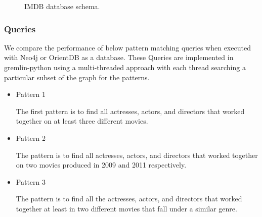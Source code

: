 \begin{figure}[t]
\centering
{}
\caption{IMDB database schema.}
\label{fig:schema}
\centering
\end{figure}

\subsubsection{Queries}

We compare the performance of below pattern matching queries when executed with Neo4j or OrientDB as a database. These Queries are implemented in gremlin-python using a multi-threaded approach with each thread searching a particular subset of the graph for the patterns. 

\begin{itemize}

\item Pattern 1

The first pattern is to find all actresses, actors, and directors that worked together on at least three different movies.

\item Pattern 2

The pattern is to find all actresses, actors, and directors that worked together on two movies produced in 2009 and 2011 respectively.

\item Pattern 3

The pattern is to find all the actresses, actors, and directors that worked together at least in two different movies that fall under a similar genre.

\end{itemize}

